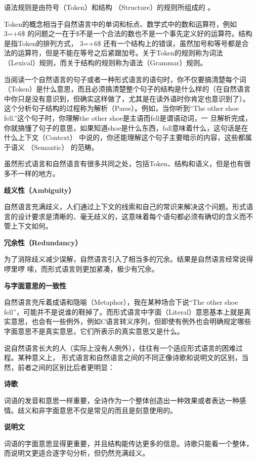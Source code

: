 \documentclass[12pt]{book}
\begin{document}
语法规则是由符号（Token）和结构 （Structure）的规则所组成的 。

Token的概念相当于自然语言中的单词和标点、数学式中的数和运算符，例如3=+6\$
的问题之一在于\$不是一个合法的数也不是一个事先定义好的运算符。结构是指Token的排列方式，
3=+6\$
还有一个结构上的错误，虽然加号和等号都是合法的运算符，但是不能在等号之后紧跟加号。关于Token的规则称为词法（Lexical）规则，而关于结构的规则称为语法（Grammar）规则。

当阅读一个自然语言的句子或者一种形式语言的语句时，你不仅要搞清楚每个词（Token）是什么意思，而且必须搞清楚整个句子的结构是什么样的（在自然语言中你只是没有意识到，但确实这样做了，尤其是在读外语时你肯定也意识到了）。这个分析句子结构的过程称为解析（Parse）。例如，当你听到``The
other shoe fell.''这个句子时，你理解the other
shoe是主语而fell是谓语动词，一
旦解析完成，你就搞懂了句子的意思，如果知道shoe是什么东西，fall意味着什么，这句话是在什么上下文（Context）
中说的，你还能理解这个句子主要暗示的内容，这些都属于语义 （Semantic）
的范畴。

虽然形式语言和自然语言有很多共同之处，包括Token、结构和语义，但是也有很多不一样的地方。

\textbf{歧义性（Ambiguity）}

自然语言充满歧义，人们通过上下文的线索和自己的常识来解决这个问题。形式语言的设计要求是清晰的、毫无歧义的，这意味着每个语句都必须有确切的含义而不管上下文如何。

\textbf{冗余性（Redundancy）}

为了消除歧义减少误解，自然语言引入了相当多的冗余。结果是自然语言经常说得啰里啰
嗦，而形式语言则更加紧凑，极少有冗余。

\textbf{与字面意思的一致性}

自然语言充斥着成语和隐喻（Metaphor），我在某种场合下说``The other shoe
fell''，可能并不是说谁的鞋掉了。而形式语言中字面（Literal）意思基本上就是真实意思，也会有一些例外，例如C语言转义序列，但即使有例外也会明确规定哪些字面意思不是真实意思，它们所表示的真实意思又是什么。

说自然语言长大的人（实际上没有人例外），往往有一个适应形式语言的困难过程。某种意义上，
形式语言和自然语言之间的不同正像诗歌和说明文的区别，当然，前者之间的区别比后者更明显：

\textbf{诗歌}

词语的发音和意思一样重要，全诗作为一个整体创造出一种效果或者表达一种感情。歧义和非字面意思不仅是常见的而且是刻意使用的。

\textbf{说明文}

词语的字面意思显得更重要，并且结构能传达更多的信息。诗歌只能看一个整体，而说明文更适合逐字句分析，但仍然充满歧义。
\end{document}
